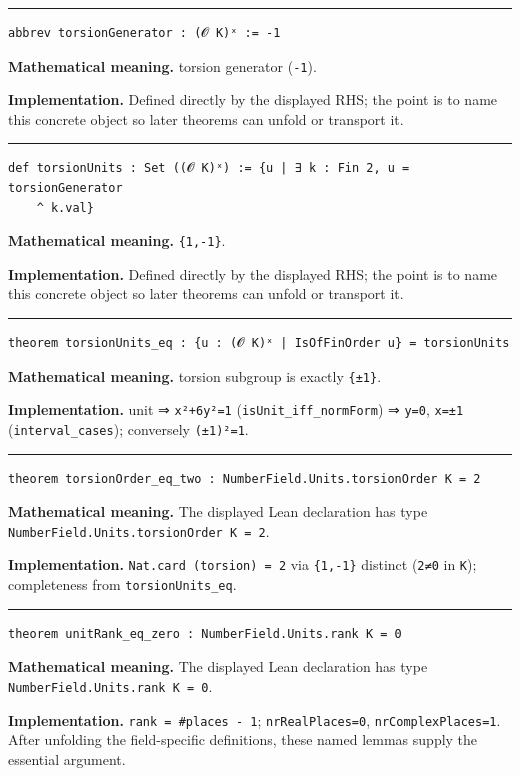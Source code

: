 \documentclass[UTF8,a4paper,11pt,fontset=fandol]{ctexart}
\theoremstyle{definition}
\newcommand{\statementsep}{\par\medskip\hrule\medskip}
\begin{document}
\statementsep
\begin{verbatim}
abbrev torsionGenerator : (𝓞 K)ˣ := -1
\end{verbatim}
\noindent\textbf{Mathematical meaning.} torsion generator (\texttt{-1}).\par
\noindent\textbf{Implementation.} Defined directly by the displayed RHS; the point is to name this concrete object so later theorems can unfold or transport it.\par
\statementsep
\begin{verbatim}
def torsionUnits : Set ((𝓞 K)ˣ) := {u | ∃ k : Fin 2, u = torsionGenerator
    ^ k.val}
\end{verbatim}
\noindent\textbf{Mathematical meaning.} \texttt{\{1,-1\}}.\par
\noindent\textbf{Implementation.} Defined directly by the displayed RHS; the point is to name this concrete object so later theorems can unfold or transport it.\par
\statementsep
\begin{verbatim}
theorem torsionUnits_eq : {u : (𝓞 K)ˣ | IsOfFinOrder u} = torsionUnits
\end{verbatim}
\noindent\textbf{Mathematical meaning.} torsion subgroup is exactly \texttt{\{±1\}}.\par
\noindent\textbf{Implementation.} unit ⇒ \texttt{x²+6y²=1} (\texttt{isUnit\_\allowbreak{}iff\_\allowbreak{}normForm}) ⇒ \texttt{y=0}, \texttt{x=±1} (\texttt{interval\_\allowbreak{}cases}); conversely \texttt{(±1)²=1}.\par
\statementsep
\begin{verbatim}
theorem torsionOrder_eq_two : NumberField.Units.torsionOrder K = 2
\end{verbatim}
\noindent\textbf{Mathematical meaning.} The displayed Lean declaration has type \texttt{NumberField.\allowbreak{}Units.\allowbreak{}torsionOrder K = 2}.\par
\noindent\textbf{Implementation.} \texttt{Nat.\allowbreak{}card (torsion) = 2} via \texttt{\{1,-1\}} distinct (\texttt{2≠0} in \texttt{K}); completeness from \texttt{torsionUnits\_\allowbreak{}eq}.\par
\statementsep
\begin{verbatim}
theorem unitRank_eq_zero : NumberField.Units.rank K = 0
\end{verbatim}
\noindent\textbf{Mathematical meaning.} The displayed Lean declaration has type \texttt{NumberField.\allowbreak{}Units.\allowbreak{}rank K = 0}.\par
\noindent\textbf{Implementation.} \texttt{rank = \#places - 1}; \texttt{nrRealPlaces=0}, \texttt{nrComplexPlaces=1}. After unfolding the field-specific definitions, these named lemmas supply the essential argument.\par
\end{document}
